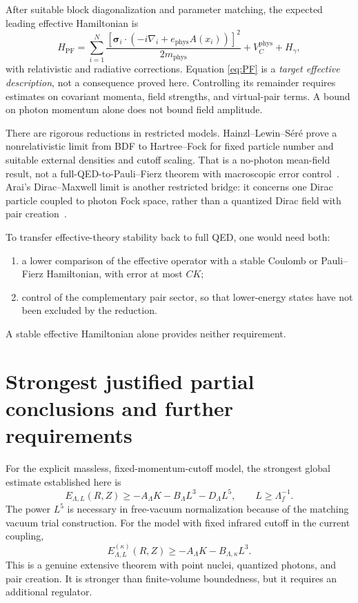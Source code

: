 After suitable block diagonalization and parameter matching, the expected
leading effective Hamiltonian is
\begin{equation}
H_{\mathrm{PF}}=
\sum_{i=1}^N
\frac{\left[\boldsymbol\sigma_i\cdot
(-i\nabla_i+e_{\mathrm{phys}}A(x_i))\right]^2}
{2m_{\mathrm{phys}}}
+V_C^{\mathrm{phys}}+H_\gamma,
\label{eq:PF}
\end{equation}
with relativistic and radiative corrections.
Equation \eqref{eq:PF} is a \emph{target effective description}, not a
consequence proved here. Controlling its remainder requires estimates on
covariant momenta, field strengths, and virtual-pair terms. A bound on
photon momentum alone does not bound field amplitude.

There are rigorous reductions in restricted models.
Hainzl--Lewin--S\'er\'e prove a nonrelativistic limit from BDF to
Hartree--Fock for fixed particle number and suitable external densities
and cutoff scaling. That is a no-photon mean-field result, not a
full-QED-to-Pauli--Fierz theorem with macroscopic error
control~\cite{HLS2008}. Arai's Dirac--Maxwell limit is another restricted
bridge: it concerns one Dirac particle coupled to photon Fock space,
rather than a quantized Dirac field with pair creation~\cite{Arai2003}.

To transfer effective-theory stability back to full QED, one would need both:
\begin{enumerate}
\item a lower comparison of the effective operator with a stable Coulomb
or Pauli--Fierz Hamiltonian, with error at most \(CK\);
\item control of the complementary pair sector, so that lower-energy
states have not been excluded by the reduction.
\end{enumerate}
A stable effective Hamiltonian alone provides neither requirement.

\section{Strongest justified partial conclusions and further requirements}
\label{sec:conclusions}
For the explicit massless, fixed-momentum-cutoff model, the strongest
global estimate established here is
\begin{equation}
\boxed{
E_{\Lambda,L}(R,Z)\ge
-A_\Lambda K-B_\Lambda L^3-D_\Lambda L^5,\qquad
L\ge\Lambda_f^{-1}.}
\end{equation}
The power \(L^5\) is necessary in free-vacuum normalization because of
the matching vacuum trial construction.
For the model with fixed infrared cutoff in the current coupling,
\begin{equation}
\boxed{
E_{\Lambda,L}^{(\kappa)}(R,Z)
\ge-A_\Lambda K-B_{\Lambda,\kappa}L^3.}
\end{equation}
This is a genuine extensive theorem with point nuclei, quantized photons,
and pair creation. It is stronger than finite-volume boundedness, but it
requires an additional regulator.

